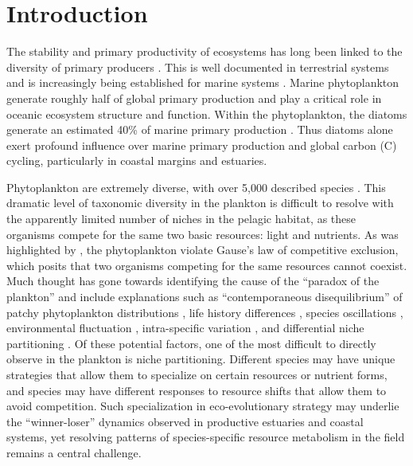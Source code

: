 \section{Introduction}
The stability and primary productivity of ecosystems has long been linked to the diversity of primary producers \citep{Elton1958, Cardinale2012}. This is well documented in terrestrial systems \citep{Naeem1994, Tilman2001, Cadotte2013, Balvanera2006, Tilman1996} and is increasingly being established for marine systems \citep{Behl2011, Striebel2009, Steiner2005, Ptacnik2008}. Marine phytoplankton generate roughly half of global primary production \citep{Nielsen1960, Strickland1965, Field1998} and play a critical role in oceanic ecosystem structure and function. Within the phytoplankton, the diatoms generate an estimated 40\% of marine primary production \citep{Nelson1995}. Thus diatoms alone exert profound influence over marine primary production and global carbon (C) cycling, particularly in coastal margins and estuaries. \par
Phytoplankton are extremely diverse, with over 5,000 described species \citep{Sournia1991, Tett1995, Mann1996}. This dramatic level of taxonomic diversity in the plankton is difficult to resolve with the apparently limited number of niches in the pelagic habitat, as these organisms compete for the same two basic resources: light and nutrients. As was highlighted by \citet{Hutchinson1961}, the phytoplankton violate Gause's law of competitive exclusion, which posits that two organisms competing for the same resources cannot coexist. Much thought has gone towards identifying the cause of the ``paradox of the plankton'' and include explanations such as ``contemporaneous disequilibrium'' of patchy phytoplankton distributions \citep{Richerson1970}, life history differences \citep{Huisman2001}, species oscillations \citep{Huisman1999}, environmental fluctuation \citep{Roy2007}, intra-specific variation \citep{Menden-deuer2014}, and differential niche partitioning \citep{Connel1980}. Of these potential factors, one of the most difficult to directly observe in the plankton is niche partitioning. Different species may have unique strategies that allow them to specialize on certain resources or nutrient forms, and species may have different responses to resource shifts that allow them to avoid competition. Such specialization in eco-evolutionary strategy may underlie the ``winner-loser'' dynamics observed in productive estuaries and coastal systems, yet resolving patterns of species-specific resource metabolism in the field remains a central challenge.\par
